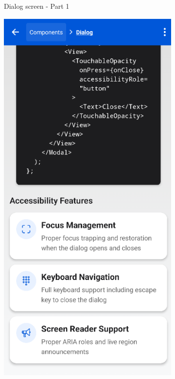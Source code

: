 \begin{enumerate}
\begin{itemize}
\begin{figure}[ht]
\begin{subfigure}[b]{0.48\textwidth}
                \caption{Dialog screen - Part 1}
                \label{fig:dialog-left}
            \end{subfigure}
            \hfill
            \begin{subfigure}[b]{0.48\textwidth}
                \centering
                \includegraphics[width=\linewidth, alt={Second part of the Dialog screen}]{img/dialog2.png}

\end{subfigure}
\end{figure}
\end{itemize}
\end{enumerate}
